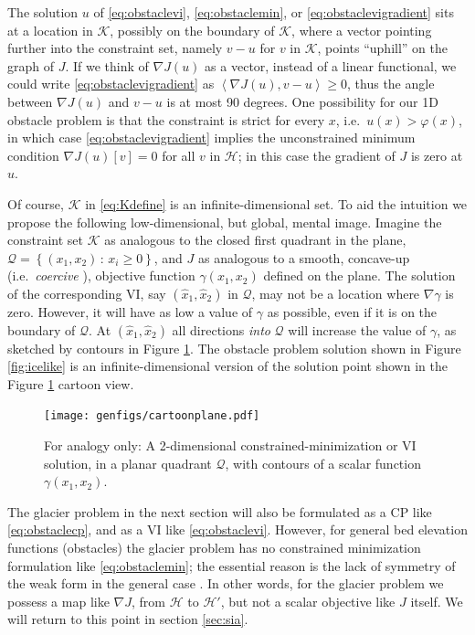 \documentclass[letterpaper,final,12pt,reqno]{amsart}
\newcommand{\grad}{\nabla}
\newcommand{\ip}[2]{\left<#1,#2\right>}
\numberwithin{equation}{section}
\numberwithin{figure}{section}
\numberwithin{table}{section}
\begin{document}
The solution $u$ of \eqref{eq:obstaclevi}, \eqref{eq:obstaclemin}, or \eqref{eq:obstaclevigradient} sits at a location in $\mathcal{K}$, possibly on the boundary of $\mathcal{K}$, where a vector pointing further into the constraint set, namely $v-u$ for $v$ in $\mathcal{K}$, points ``uphill'' on the graph of $J$.  If we think of $\nabla J(u)$ as a vector, instead of a linear functional, we could write \eqref{eq:obstaclevigradient} as $\ip{\nabla J(u)}{v-u} \ge 0$, thus the angle between $\nabla J(u)$ and $v-u$ is at most 90 degrees.  One possibility for our 1D obstacle problem is that the constraint is strict for every $x$, i.e.~$u(x) > \varphi(x)$, in which case \eqref{eq:obstaclevigradient} implies the unconstrained minimum condition $\nabla J(u)[v] = 0$ for all $v$ in $\mathcal{H}$; in this case the gradient of $J$ is zero at $u$.

Of course, $\mathcal{K}$ in \eqref{eq:Kdefine} is an infinite-dimensional set.  To aid the intuition we propose the following low-dimensional, but global, mental image.  Imagine the constraint set $\mathcal{K}$ as analogous to the closed first quadrant in the plane, $\mathcal{Q} = \left\{(x_1,x_2)\,:\,x_i\ge 0\right\}$, and $J$ as analogous to a smooth, concave-up (i.e.~\emph{coercive} \cite{Evans2010}), objective function $\gamma(x_1,x_2)$ defined on the plane.  The solution of the corresponding VI, say $(\hat x_1,\hat x_2)$ in $\mathcal{Q}$, may not be a location where $\nabla \gamma$ is zero.  However, it will have as low a value of $\gamma$ as possible, even if it is on the boundary of $\mathcal{Q}$.  At $(\hat x_1,\hat x_2)$ all directions \emph{into} $\mathcal{Q}$ will increase the value of $\gamma$, as sketched by contours in Figure \ref{fig:cartoonplane}.  The obstacle problem solution shown in Figure \ref{fig:icelike} is an infinite-dimensional version of the solution point shown in the Figure \ref{fig:cartoonplane} cartoon view.

\begin{figure}
\texttt{[image: genfigs/cartoonplane.pdf]}
\caption{For analogy only:  A 2-dimensional constrained-minimization or VI solution, in a planar quadrant $\mathcal{Q}$, with contours of a scalar function $\gamma(x_1,x_2)$.}
\label{fig:cartoonplane}
\end{figure}

The glacier problem in the next section will also be formulated as a CP like \eqref{eq:obstaclecp}, and as a VI like \eqref{eq:obstaclevi}.  However, for general bed elevation functions (obstacles) the glacier problem has no constrained minimization formulation like \eqref{eq:obstaclemin}; the essential reason is the lack of symmetry of the weak form in the general case \cite{JouvetBueler2012}.  In other words, for the glacier problem we possess a map like $\grad J$, from $\mathcal{H}$ to $\mathcal{H}'$, but not a scalar objective like $J$ itself.  We will return to this point in section \ref{sec:sia}.
\end{document}
